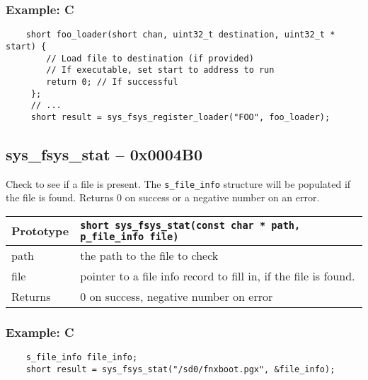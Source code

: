 \subsubsection*{Example: C}
\begin{lstlisting}
    short foo_loader(short chan, uint32_t destination, uint32_t * start) {
        // Load file to destination (if provided)
        // If executable, set start to address to run
        return 0; // If successful
     };
     // ...
     short result = sys_fsys_register_loader("FOO", foo_loader);
\end{lstlisting}

\subsection*{sys\_fsys\_stat -- 0x0004B0}
Check to see if a file is present. The \verb+s_file_info+ structure will be populated if the file is found.
Returns 0 on success or a negative number on an error.

\bigskip

\begin{tabular}{|l||l|} \hline
Prototype & \lstinline!short sys_fsys_stat(const char * path, p_file_info file)! \\ \hline
path & the path to the file to check \\ \hline
file & pointer to a file info record to fill in, if the file is found. \\ \hline
Returns & 0 on success, negative number on error \\ \hline
\end{tabular}

\subsubsection*{Example: C}
\begin{lstlisting}
    s_file_info file_info;
    short result = sys_fsys_stat("/sd0/fnxboot.pgx", &file_info);
\end{lstlisting}